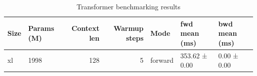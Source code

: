 \begin{table}
\caption{Transformer benchmarking results}
\label{tab:benchmarks}
\begin{tabular}{llrrlll}
\toprule
Size & Params (M) & Context len & Warmup steps & Mode & fwd mean (ms) & bwd mean (ms) \\
\midrule
xl & 1998 & 128 & 5 & forward & 353.62 ± 0.00 & 0.00 ± 0.00 \\
\bottomrule
\end{tabular}
\end{table}
